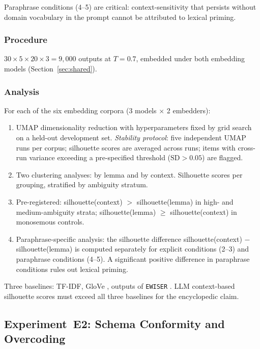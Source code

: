 \documentclass[12pt,a4paper]{article}
\begin{document}
Paraphrase conditions (4--5) are critical: context-sensitivity that persists
without domain vocabulary in the prompt cannot be attributed to lexical priming.

\subsubsection{Procedure}

$30 \times 5 \times 20 \times 3 = 9{,}000$ outputs at $T = 0.7$, embedded under
both embedding models (Section~\ref{sec:shared}).

\subsubsection{Analysis}

For each of the six embedding corpora (3 models $\times$ 2 embedders):

\begin{enumerate}
\item UMAP dimensionality reduction with hyperparameters fixed by grid
      search on a held-out development set. \emph{Stability protocol}:
      five independent UMAP runs per corpus; silhouette scores are averaged
      across runs; items with cross-run variance exceeding a pre-specified
      threshold ($\text{SD} > 0.05$) are flagged.
\item Two clustering analyses: by lemma and by context. Silhouette scores
      per grouping, stratified by ambiguity stratum.
\item Pre-registered: silhouette(context) $>$ silhouette(lemma) in high- and
      medium-ambiguity strata; silhouette(lemma) $\geq$ silhouette(context) in
      monosemous controls.
\item Paraphrase-specific analysis: the silhouette difference
      silhouette(context) $-$ silhouette(lemma) is computed separately for
      explicit conditions (2--3) and paraphrase conditions (4--5). A significant
      positive difference in paraphrase conditions rules out lexical priming.
\end{enumerate}

Three baselines: TF-IDF, GloVe \citep{Pennington2014}, outputs of
\texttt{EWISER} \citep{Bevilacqua2020}. LLM context-based silhouette scores
must exceed all three baselines for the encyclopedic claim.

\subsection{Experiment~E2: Schema Conformity and Overcoding}
\label{sec:exp2}
\end{document}

